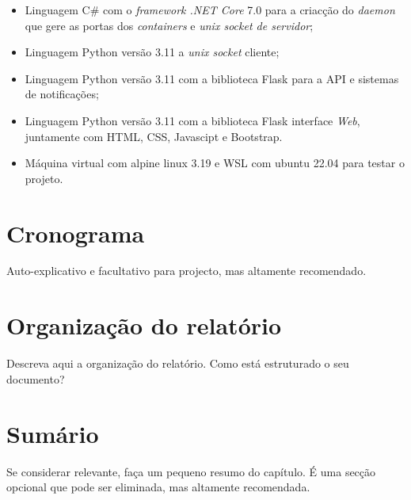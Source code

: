 \begin{itemize}
\item Linguagem C\# com o \textit{framework .NET Core} 7.0 para a criacção do \textit{daemon} que gere
as portas dos \textit{containers} e \textit{unix socket de servidor};
\item Linguagem Python versão 3.11 a \textit{unix socket} cliente;
\item Linguagem Python versão 3.11 com a biblioteca Flask para a API e sistemas de notificações;
\item Linguagem Python versão 3.11 com a biblioteca Flask interface \textit{Web}, juntamente com HTML, CSS, Javascipt e Bootstrap.
\item Máquina virtual com alpine linux 3.19 e WSL com ubuntu 22.04 para testar o projeto.
\end{itemize}


\section{Cronograma}
\label{sec:intro_chronos}

Auto-explicativo e facultativo para projecto, mas altamente recomendado.


\section{Organização do relatório}
\label{sec:intro_struct}

Descreva aqui a organização do relatório. Como está estruturado o seu documento?

\section*{Sumário}
\label{sec:intro_summary}
Se considerar relevante, faça um pequeno resumo do capítulo. É uma secção opcional que pode ser eliminada, mas altamente recomendada.
\\
\\
\\
\\
